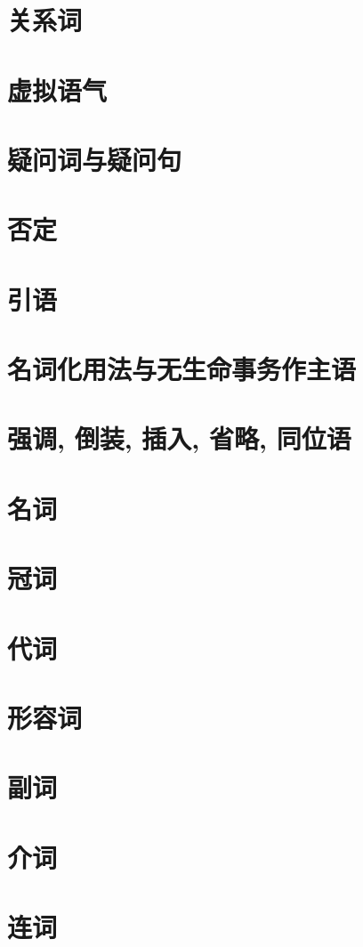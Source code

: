 \documentclass{article}
\begin{document}
\section{关系词}
\section{虚拟语气}
\section{疑问词与疑问句}
\section{否定}
\section{引语}
\section{名词化用法与无生命事务作主语}
\section{强调, 倒装, 插入, 省略, 同位语}
\section{名词}
\section{冠词}
\section{代词}
\section{形容词}
\section{副词}
\section{介词}
\section{连词}
\end{document}
